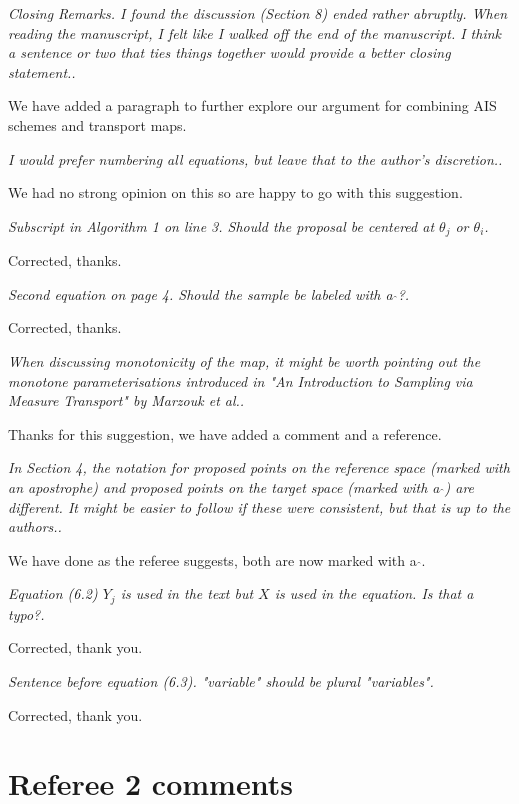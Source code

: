 \documentclass{article}
\newcommand{\comment}[2]{\vspace{0.6cm}{\bf Comment:} {\it #1.}

\vspace{0.3cm}{\bf Answer:} #2}
\begin{document}

\comment{Closing Remarks. I found the discussion (Section 8) ended rather abruptly. When reading the manuscript, I felt like I walked off the end of the manuscript. I think a sentence or two that ties things together would provide a better closing statement.}{We have added a paragraph to further explore our argument for combining AIS schemes and transport maps.}


\comment{I would prefer numbering all equations, but leave that to the author's discretion.}{We had no strong opinion on this so are happy to go with this suggestion.}


\comment{Subscript in Algorithm 1 on line 3. Should the proposal be centered at $\theta_j$ or $\theta_i$}{Corrected, thanks.}



\comment{Second equation on page 4. Should the sample be labeled with a $\hat{ }$?}{Corrected, thanks.}


\comment{When discussing monotonicity of the map, it might be worth pointing out the monotone parameterisations introduced in "An Introduction to Sampling via Measure Transport" by Marzouk et al.}{Thanks for this suggestion, we have added a comment and a reference.}


\comment{In Section 4, the notation for proposed points on the reference space (marked with an apostrophe) and proposed points on the target space (marked with a $\hat{ }$) are different. It might be easier to follow if these were consistent, but that is up to the authors.}{We have done as the referee suggests, both are now marked with a $\hat{ }$.}

\comment{Equation (6.2) $Y_j$ is used in the text but $X$ is used in the equation. Is that a typo?}{Corrected, thank you.}


\comment{Sentence before equation (6.3). "variable" should be plural "variables"}{Corrected, thank you.}


\section*{Referee 2 comments}
\end{document}

